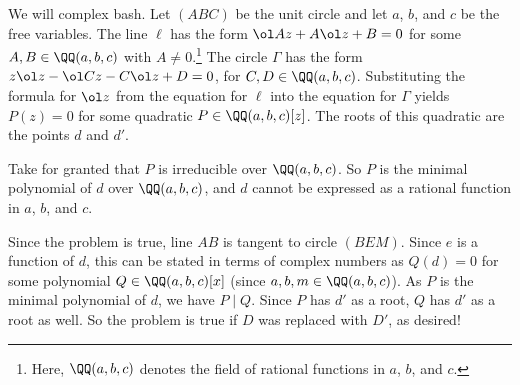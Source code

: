 \documentclass[11pt]{scrartcl}
\begin{document}
We will complex bash. Let $(ABC)$ be the unit circle and let $a$, $b$, and $c$ be the free variables. The line $\ell$ has the form $\ol Az + A\ol z + B = 0$ for some $A,B \in \QQ(a,b,c)$ with $A \neq 0$.\footnote{Here, $\QQ(a,b,c)$ denotes the field of rational functions in $a$, $b$, and $c$.} The circle $\Gamma$ has the form $z\ol z - \ol Cz - C\ol z + D = 0$, for $C,D \in \QQ(a,b,c)$. Substituting the formula for $\ol z$ from the equation for $\ell$ into the equation for $\Gamma$ yields $P(z) = 0$ for some quadratic $P \in \QQ(a,b,c)[z]$. The roots of this quadratic are the points $d$ and $d'$.

Take for granted that $P$ is irreducible over $\QQ(a,b,c)$. So $P$ is the minimal polynomial of $d$ over $\QQ(a,b,c)$, and $d$ cannot be expressed as a rational function in $a$, $b$, and $c$.

Since the problem is true, line $AB$ is tangent to circle $(BEM)$. Since $e$ is a function of $d$, this can be stated in terms of complex numbers as $Q(d) = 0$ for some polynomial $Q \in \QQ(a,b,c)[x]$ (since $a,b,m \in \QQ(a,b,c)$). As $P$ is the minimal polynomial of $d$, we have $P \mid Q$. Since $P$ has $d'$ as a root, $Q$ has $d'$ as a root as well. So the problem is true if $D$ was replaced with $D'$, as desired!
\end{document}
